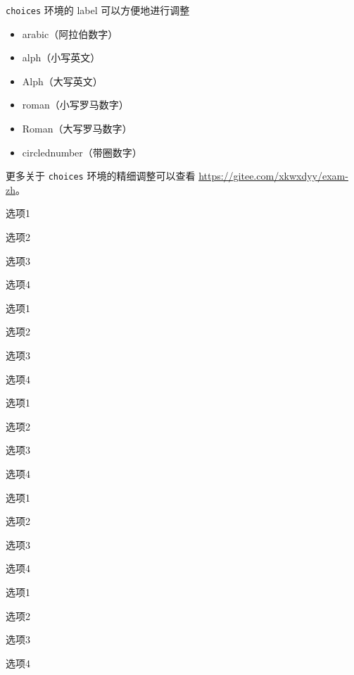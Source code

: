 \verb|choices| 环境的 label 可以方便地进行调整
\begin{itemize}
  \item arabic（阿拉伯数字）
  \item alph（小写英文）
  \item Alph（大写英文）
  \item roman（小写罗马数字）
  \item Roman（大写罗马数字）
  \item circlednumber（带圈数字）
\end{itemize}

更多关于 \verb|choices| 环境的精细调整可以查看 \url{https://gitee.com/xkwxdyy/exam-zh}。

\begin{choices}[label = \arabic*)]
  \item 选项1
  \item 选项2
  \item 选项3
  \item 选项4
\end{choices}

\begin{choices}[label = (\alph*]
  \item 选项1
  \item 选项2
  \item 选项3
  \item 选项4
\end{choices}

\begin{choices}[label = \Alph*.]
  \item 选项1
  \item 选项2
  \item 选项3
  \item 选项4
\end{choices}

\begin{choices}[label = \roman*:]
  \item 选项1
  \item 选项2
  \item 选项3
  \item 选项4
\end{choices}

\begin{choices}[label = \Roman*-]
  \item 选项1
  \item 选项2
  \item 选项3
  \item 选项4
\end{choices}

